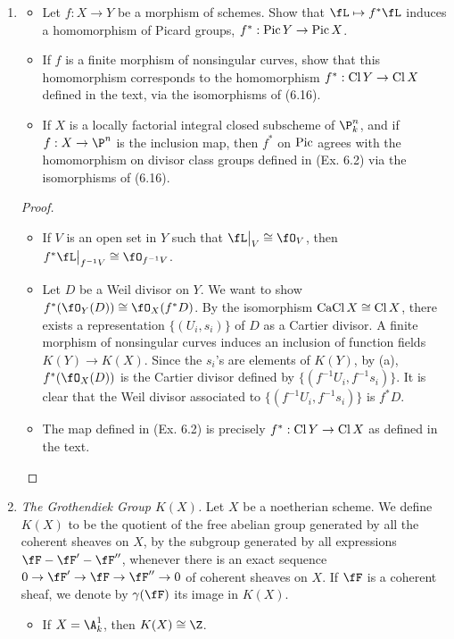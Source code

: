 \documentclass[a4paper]{article}
\begin{document}
\begin{enumerate} [label=\textbf{\arabic*.}, leftmargin=0em]
\item[\textbf{8.}]
\begin{itemize}
    \item[(a)] Let $f : X \to Y$ be a morphism of schemes. Show that $\fL \mapsto f^* \fL$ induces a homomorphism of Picard groups, $f^* : \operatorname{Pic} Y \to \operatorname{Pic} X$.

    \item[(b)] If $f$ is a finite morphism of nonsingular curves, show that this homomorphism corresponds to the homomorphism $f^* : \operatorname{Cl} Y \to \operatorname{Cl} X$ defined in the text, via the isomorphisms of (6.16).

    \item[(c)] If $X$ is a locally factorial integral closed subscheme of $\P_k^n$, and if $f : X \to \P^n$ is the inclusion map, then $f^*$ on $\operatorname{Pic}$ agrees with the homomorphism on divisor class groups defined in (Ex. 6.2) via the isomorphisms of (6.16).
\end{itemize}

\begin{proof} $ $ \vspace{0pt}
\begin{itemize} [leftmargin=0cm]
\item[(a)] If $V$ is an open set in $Y$ such that $\restr{\fL}{V} \cong \fO_V$, then $\restr{f^*\fL}{f^{-1}V} \cong \fO_{f^{-1}V}$.

\item[(b)] Let $D$ be a Weil divisor on $Y$. We want to show $f^* (\fO_Y(D)) \cong \fO_X(f^*D)$. By the isomorphism $\operatorname{CaCl}{X} \cong \operatorname{Cl}{X}$, there exists a representation $\{ (U_i, s_i) \}$ of $D$ as a Cartier divisor.
A finite morphism of nonsingular curves induces an inclusion of function fields $K(Y) \to K(X)$.
Since the $s_i$'s are elements of $K(Y)$, by (a), $f^*(\fO_X(D))$ is the Cartier divisor defined by $\{ (f^{-1}U_i, f^{-1}s_i)\}$.
It is clear that the Weil divisor associated to $\{ (f^{-1}U_i, f^{-1}s_i)\}$ is $f^* D$. 

\item[(c)] The map defined in (Ex. 6.2) is precisely $f^* : \operatorname{Cl}{Y} \to \operatorname{Cl}{X}$ as defined in the text.
\end{itemize} 
\end{proof}

\item[\textbf{10.}] \textit{The Grothendiek Group $K(X)$.} Let $X$ be a noetherian scheme. We define $K(X)$ to be the quotient of the free abelian group generated by all the coherent sheaves on $X$, by the subgroup generated by all expressions $\fF - \fF' - \fF''$, whenever there is an exact sequence $0 \to \fF' \to \fF \to \fF'' \to 0$ of coherent sheaves on $X$. If $\fF$ is a coherent sheaf, we denote by $\gamma(\fF)$ its image in $K(X)$.
\begin{itemize}
    \item[(a)] If $X = \A_k^1$, then $K(X) \cong \Z$.


\end{itemize}
\end{enumerate}
\end{document}
